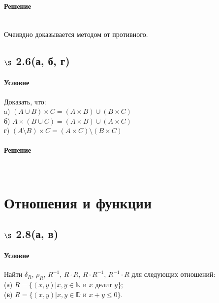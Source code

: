 \documentclass[a4paper,12pt]{article}
\begin{document}
\paragraph*{Решение} \mbox{}\\
Очеивдно доказывается методом от противного.

\subsection*{$\S$ 2.6(а, б, г)}
\paragraph*{Условие}
Доказать, что:\\
a) $ ( A \cup B ) \times C = ( A \times B ) \cup ( B \times C ) $\\
б) $ A \times ( B \cup C ) = ( A \times B ) \cup ( A \times C ) $\\
г) $ ( A \setminus B ) \times C = ( A \times C ) \setminus ( B \times C ) $
\paragraph*{Решение} \mbox{}\\

\section{Отношения и функции}
\subsection*{$\S$ 2.8(а, в)}
\paragraph*{Условие}
Найти $\delta_R$, $\rho_R$, $R^{-1}$, $R\cdot R$, $R\cdot R^{-1}$, $R^{-1}\cdot R$ для следующих отношений:\\
(а) $R=\{(x,y)|x,y\in \mathbb{N}$ и $x$ делит $y$\}; \\
(в) $R=\{(x,y)|x,y\in \mathbb{D}$ и $x+y\leqslant 0\}$.
\end{document}

